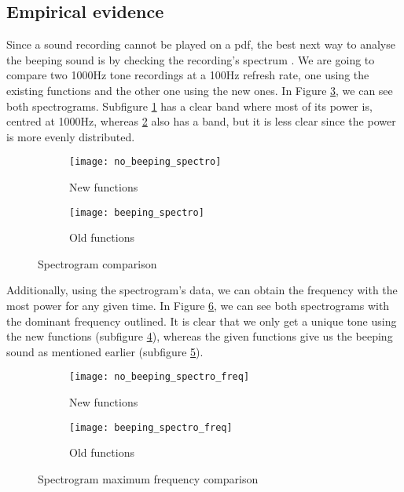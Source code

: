 \subsection{Empirical evidence}
Since a sound recording cannot be played on a pdf, the best next way to analyse the beeping sound is by checking the recording's spectrum . We are going to compare two 1000Hz tone recordings at a 100Hz refresh rate, one using the existing functions and the other one using the new ones. In Figure \ref{fig:spectro}, we can see both spectrograms. Subfigure \ref{fig:spectro_no_beep} has a clear band where most of its power is, centred at 1000Hz, whereas \ref{fig:spectro_beep} also has a band, but it is less clear since the power is more evenly distributed.
\begin{figure}[hbt!]
	\centering
	\begin{subfigure}{0.48\linewidth}
		\centering
		\texttt{[image: no\_beeping\_spectro]}
		\caption{New functions}
		\label{fig:spectro_no_beep}
	\end{subfigure}
	\begin{subfigure}{0.48\linewidth}
		\centering
		\texttt{[image: beeping\_spectro]}
		\caption{Old functions}
		\label{fig:spectro_beep}
	\end{subfigure}
	\caption{Spectrogram comparison}
	\label{fig:spectro}
\end{figure}

Additionally, using the spectrogram's data, we can obtain the frequency with the most power for any given time. In Figure \ref{fig:spectro_freq}, we can see both spectrograms with the dominant frequency outlined. It is clear that we only get a unique tone using the new functions (subfigure \ref{fig:spectro_freq_no_beep}), whereas the given functions give us the beeping sound as mentioned earlier (subfigure \ref{fig:spectro_freq_beep}).

\begin{figure}[hbt!]
	\centering
	\begin{subfigure}{0.48\linewidth}
		\centering
		\texttt{[image: no\_beeping\_spectro\_freq]}
		\caption{New functions}
		\label{fig:spectro_freq_no_beep}
	\end{subfigure}
	\begin{subfigure}{0.48\linewidth}
		\centering
		\texttt{[image: beeping\_spectro\_freq]}
		\caption{Old functions}
		\label{fig:spectro_freq_beep}
	\end{subfigure}
	\caption{Spectrogram maximum frequency comparison}
	\label{fig:spectro_freq}
\end{figure}



